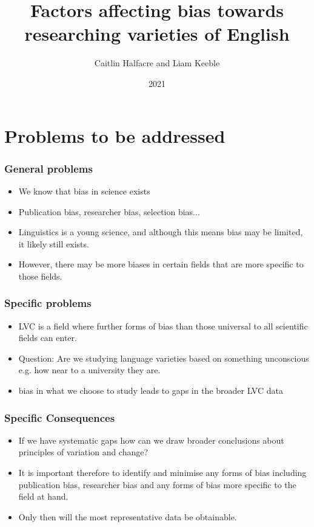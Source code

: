 \documentclass{beamer}
\title{Factors affecting bias towards researching varieties of English}
\author{Caitlin Halfacre and Liam Keeble}
\date{2021}
\begin{document}
\frame{\titlepage}


\section{Problems to be addressed}
\begin{frame}
\frametitle{General problems}
\begin{itemize}
\item We know that bias in science exists
\item Publication bias, researcher bias, selection bias...
\item Linguistics is a young science, and although this means bias may be limited, it likely still exists.
\item However, there may be more biases in certain fields that are more specific to those fields.
\end{itemize}
\end{frame}


\begin{frame}
\frametitle{Specific problems}
\begin{itemize}
\item LVC is a field where further forms of bias than those universal to all scientific fields can enter.
\item Question: Are we studying language varieties based on something unconscious \\ e.g. how near to a university they are.
\item bias in what we choose to study leads to gaps in the broader LVC data
\end{itemize}
\end{frame}

\begin{frame}
\frametitle{Specific Consequences}
\begin{itemize}
\item If we have systematic gaps how can we draw broader conclusions about principles of variation and change?
\item It is important therefore to identify and minimise any forms of bias including publication bias, researcher bias and any forms of bias more specific to the field at hand.
\item Only then will the most representative data be obtainable.
\end{itemize}
\end{frame}
\end{document}
